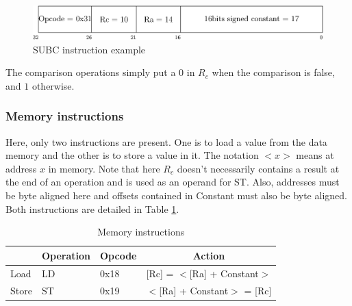 \begin{figure}[H]
    \centering
    \includegraphics[scale=0.6]{Chapter3-CPU/res/instruction_subc}
    \caption{SUBC instruction example}
    \label{fig:instructions/subc}
\end{figure}

The comparison operations simply put a $0$ in $R_c$ when the comparison is 
false, and $1$ otherwise.

\subsubsection*{Memory instructions}

Here, only two instructions are present. One is to load a value from the data memory and the other 
is to store a value in it. The notation $<x>$ means at address $x$ in memory. Note that here $R_c$
doesn't necessarily contains a result at the end of an operation and is used as an operand for ST.
Also, addresses must be byte aligned here and offsets contained in Constant must also be byte
aligned. Both instructions are detailed in Table \ref{tab:instruction/dm}.

\begin{table}[H]
    \centering
    \begin{tabular}{|l|l|l|l|}
    \hline
    \rowcolor[HTML]{DAE8FC} 
    \multicolumn{1}{|c|}{\cellcolor[HTML]{DAE8FC}\textbf{Name}} & \multicolumn{1}{c|}{\cellcolor[HTML]{DAE8FC}\textbf{Operation}} & \multicolumn{1}{c|}{\cellcolor[HTML]{DAE8FC}\textbf{Opcode}} & \multicolumn{1}{c|}{\cellcolor[HTML]{DAE8FC}\textbf{Action}} \\ \hline
    Load                                                        & LD                                                              & 0x18                                                         & {[}Rc{]} = $<${[}Ra{]} + Constant$>$      \\ \hline
    Store                                                       & ST                                                              & 0x19                                                         & $<${[}Ra{]} + Constant$>$ = {[}Rc{]}        \\ \hline
    \end{tabular}
    \caption{Memory instructions}
    \label{tab:instruction/dm}
\end{table}

